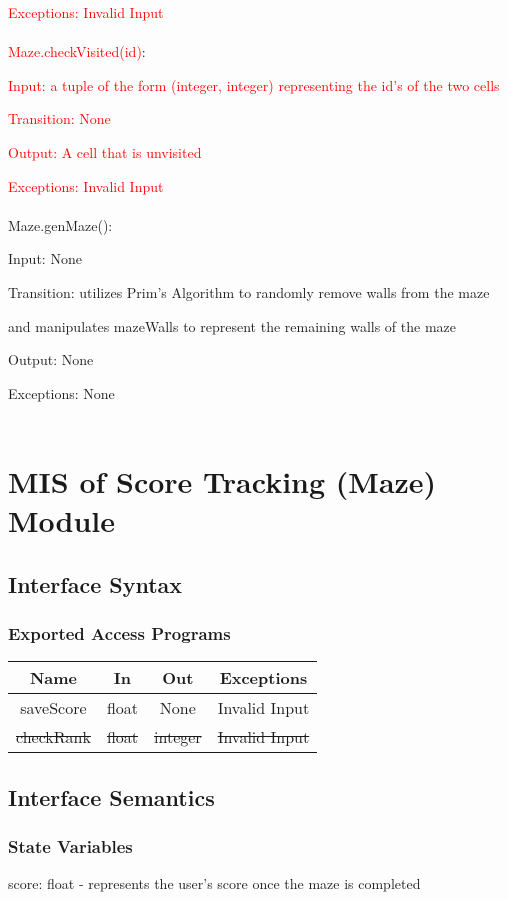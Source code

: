\documentclass[12pt, titlepage]{article}
\begin{document}
		\textcolor{red}{Exceptions: Invalid Input}\\
        \\
        \textcolor{red}{Maze.checkVisited(id)}:
		
		\textcolor{red}{Input: a tuple of the form (integer, integer) representing the id's of the two cells}
		
		\textcolor{red}{Transition: None}
		
		\textcolor{red}{Output: A cell that is unvisited}
		
		\textcolor{red}{Exceptions: Invalid Input}\\
        \\
		Maze.genMaze():
		
		Input: None
		
		Transition: utilizes Prim's Algorithm to randomly remove walls from the maze 
		
		and manipulates mazeWalls to represent the remaining walls of the maze
		
		Output: None
		
		Exceptions: None\\
        \\
\section{MIS of Score Tracking (Maze) Module}
		\subsection{Interface Syntax}
		\subsubsection{Exported Access Programs}
		\begin{tabular}[pos]{|c|c|c|c|}
			\hline
			\textbf{Name}& \textbf{In} & \textbf{Out} & \textbf{Exceptions} \\ \hline
			saveScore & float & None & Invalid Input \\ \hline
			\sout{checkRank} & \sout{float} & \sout{integer} & \sout{Invalid Input} \\ \hline
		\end{tabular}
		
		\subsection{Interface Semantics}
		\subsubsection{State Variables}
		score: float - represents the user's score once the maze is completed
\end{document}

